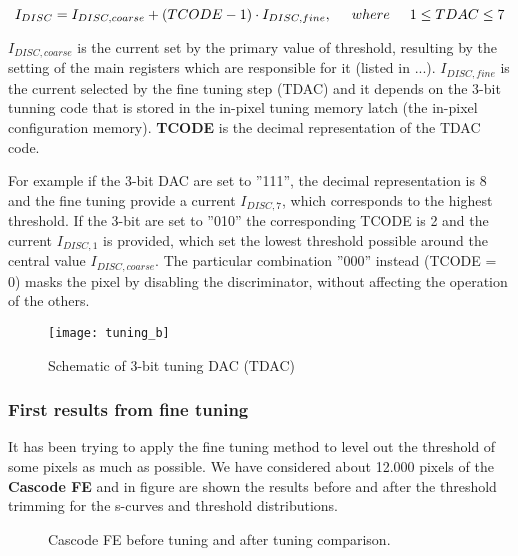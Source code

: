 \begin{equation}
I_{DISC} = I_{DISC, coarse} + (TCODE - 1) \cdot I_{DISC,fine},  \hspace{.5cm}	where \hspace{.5cm} 1 \leq TDAC \leq 7
\label{tuning_eq}
\end{equation}

\textbf{$I_{DISC, coarse}$} is the current set by the primary value of threshold, resulting by the setting of the main registers which are responsible for it (listed in ...). 
\textbf{$I_{DISC, fine}$} is the current selected by the fine tuning step (TDAC) and it depends on the 3-bit tunning code that is stored in the in-pixel tuning memory latch (the in-pixel configuration memory).
\textbf{TCODE} is the decimal representation of the TDAC code. 

For example if the 3-bit DAC are set to ''111'', the decimal representation is 8 and the fine tuning provide a current $I_{DISC,7}$, which corresponds to the highest threshold. If the 3-bit are set to ''010'' the corresponding TCODE is 2 and the current $I_{DISC,1}$ is provided,  which set the lowest threshold possible around the central value $I_{DISC,coarse}$. The particular combination ''000'' instead (TCODE = 0) masks the pixel by disabling the discriminator, without affecting the operation of the others.

\begin{figure}
\centering
\texttt{[image: tuning\_b]}
\caption{Schematic of 3-bit tuning DAC (TDAC)}
\label{fig:tdac}
\end{figure}


\subsubsection{First results from fine tuning}

It has been trying to apply the fine tuning method to level out the threshold of some pixels as much as possible. We have considered about 12.000 pixels of the \textbf{Cascode FE} and in figure  are shown the results before and after the threshold trimming for the s-curves and threshold distributions.


\begin{figure}[h!]
\centering
{}\quad
{}\quad
{}\quad
\caption{Cascode FE before tuning and after tuning comparison.}
\label{fig:casc_tuning}
\end{figure}

